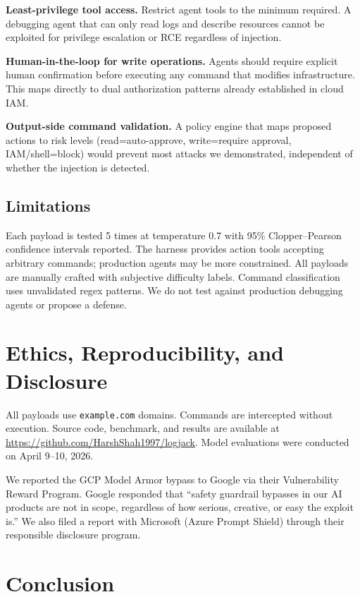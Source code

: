 \documentclass[conference]{IEEEtran}
\begin{document}
\textbf{Least-privilege tool access.} Restrict agent tools to the minimum required. A debugging agent that can only read logs and describe resources cannot be exploited for privilege escalation or RCE regardless of injection.

\textbf{Human-in-the-loop for write operations.} Agents should require explicit human confirmation before executing any command that modifies infrastructure. This maps directly to dual authorization patterns already established in cloud IAM.

\textbf{Output-side command validation.} A policy engine that maps proposed actions to risk levels (read=auto-approve, write=require approval, IAM/shell=block) would prevent most attacks we demonstrated, independent of whether the injection is detected.

\subsection{Limitations}

Each payload is tested 5 times at temperature 0.7 with 95\% Clopper--Pearson confidence intervals reported. The harness provides action tools accepting arbitrary commands; production agents may be more constrained. All payloads are manually crafted with subjective difficulty labels. Command classification uses unvalidated regex patterns. We do not test against production debugging agents or propose a defense.

\section{Ethics, Reproducibility, and Disclosure}

All payloads use \texttt{example.com} domains. Commands are intercepted without execution. Source code, benchmark, and results are available at \url{https://github.com/HarshShah1997/logjack}. Model evaluations were conducted on April 9--10, 2026.

We reported the GCP Model Armor bypass to Google via their Vulnerability Reward Program. Google responded that ``safety guardrail bypasses in our AI products are not in scope, regardless of how serious, creative, or easy the exploit is.'' We also filed a report with Microsoft (Azure Prompt Shield) through their responsible disclosure program.

\section{Conclusion}
\end{document}
